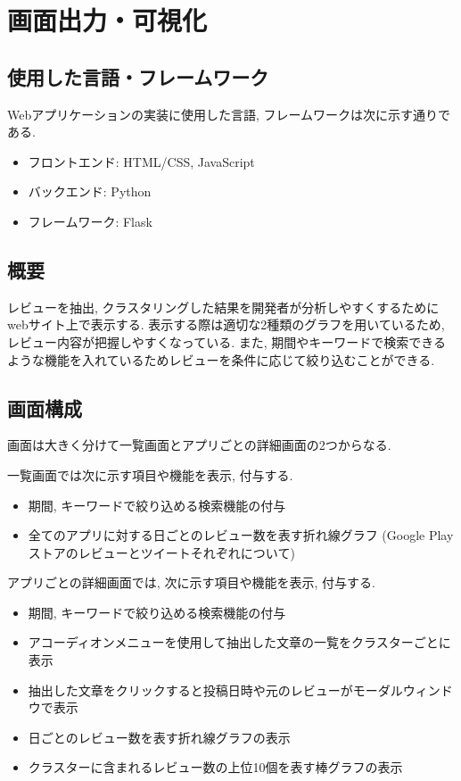 \section{画面出力・可視化}\label{display}
\subsection{使用した言語・フレームワーク}
Webアプリケーションの実装に使用した言語, フレームワークは次に示す通りである. 
\begin{itemize}
    \item フロントエンド: HTML/CSS, JavaScript
    \item バックエンド: Python
    \item フレームワーク: Flask
\end{itemize}

\subsection{概要}
レビューを抽出, クラスタリングした結果を開発者が分析しやすくするためにwebサイト上で表示する. 表示する際は適切な2種類のグラフを用いているため, レビュー内容が把握しやすくなっている. また, 期間やキーワードで検索できるような機能を入れているためレビューを条件に応じて絞り込むことができる. 

\subsection{画面構成}
画面は大きく分けて一覧画面とアプリごとの詳細画面の2つからなる. 

一覧画面では次に示す項目や機能を表示, 付与する. 

\begin{itemize}
  \item 期間, キーワードで絞り込める検索機能の付与
  \item 全てのアプリに対する日ごとのレビュー数を表す折れ線グラフ (Google Playストアのレビューとツイートそれぞれについて)
\end{itemize}

アプリごとの詳細画面では, 次に示す項目や機能を表示, 付与する.

\begin{itemize}
  \item 期間, キーワードで絞り込める検索機能の付与
  \item アコーディオンメニューを使用して抽出した文章の一覧をクラスターごとに表示
  \item 抽出した文章をクリックすると投稿日時や元のレビューがモーダルウィンドウで表示
  \item 日ごとのレビュー数を表す折れ線グラフの表示
  \item クラスターに含まれるレビュー数の上位10個を表す棒グラフの表示
\end{itemize}

